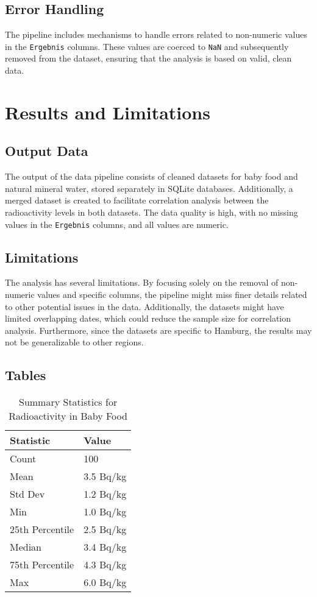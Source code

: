 \documentclass{article}
\begin{document}
\subsection{Error Handling}
The pipeline includes mechanisms to handle errors related to non-numeric values in the \texttt{Ergebnis} columns. These values are coerced to \texttt{NaN} and subsequently removed from the dataset, ensuring that the analysis is based on valid, clean data.

\section{Results and Limitations}

\subsection{Output Data}
The output of the data pipeline consists of cleaned datasets for baby food and natural mineral water, stored separately in SQLite databases. Additionally, a merged dataset is created to facilitate correlation analysis between the radioactivity levels in both datasets. The data quality is high, with no missing values in the \texttt{Ergebnis} columns, and all values are numeric.

\subsection{Limitations}
The analysis has several limitations. By focusing solely on the removal of non-numeric values and specific columns, the pipeline might miss finer details related to other potential issues in the data. Additionally, the datasets might have limited overlapping dates, which could reduce the sample size for correlation analysis. Furthermore, since the datasets are specific to Hamburg, the results may not be generalizable to other regions.

\subsection{Tables}

\begin{table}[H]
\centering
\begin{tabular}{|l|l|}
\hline
Statistic         & Value     \\ \hline
Count             & 100       \\ \hline
Mean              & 3.5 Bq/kg \\ \hline
Std Dev           & 1.2 Bq/kg \\ \hline
Min               & 1.0 Bq/kg \\ \hline
25th Percentile   & 2.5 Bq/kg \\ \hline
Median            & 3.4 Bq/kg \\ \hline
75th Percentile   & 4.3 Bq/kg \\ \hline
Max               & 6.0 Bq/kg \\ \hline
\end{tabular}
\caption{Summary Statistics for Radioactivity in Baby Food}
\end{table}
\end{document}
